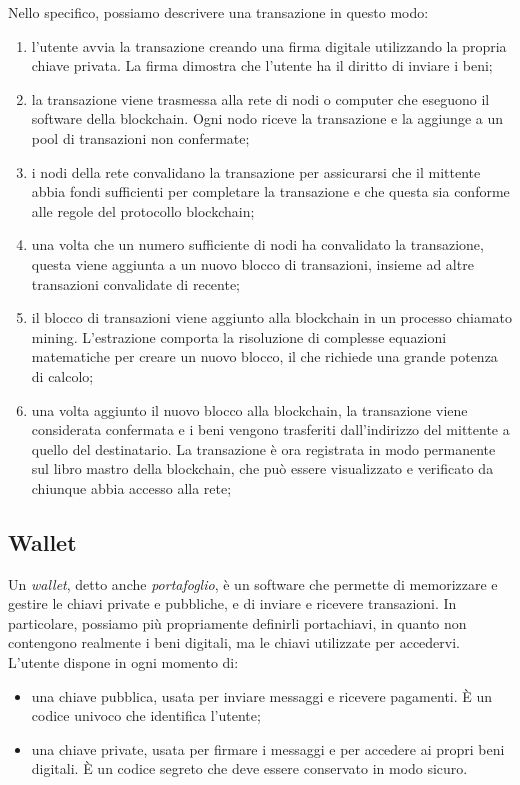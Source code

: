 Nello specifico, possiamo descrivere una transazione in questo modo:
\begin{enumerate}
    \item l'utente avvia la transazione creando una firma digitale utilizzando la propria chiave privata. La firma dimostra che l'utente ha il diritto di inviare i beni;
    \item la transazione viene trasmessa alla rete di nodi o computer che eseguono il software della blockchain. Ogni nodo riceve la transazione e la aggiunge a un pool di transazioni non confermate;
    \item i nodi della rete convalidano la transazione per assicurarsi che il mittente abbia fondi sufficienti per completare la transazione e che questa sia conforme alle regole del protocollo blockchain;
    \item una volta che un numero sufficiente di nodi ha convalidato la transazione, questa viene aggiunta a un nuovo blocco di transazioni, insieme ad altre transazioni convalidate di recente;
    \item il blocco di transazioni viene aggiunto alla blockchain in un processo chiamato mining. L'estrazione comporta la risoluzione di complesse equazioni matematiche per creare un nuovo blocco, il che richiede una grande potenza di calcolo;
    \item una volta aggiunto il nuovo blocco alla blockchain, la transazione viene considerata confermata e i beni vengono trasferiti dall'indirizzo del mittente a quello del destinatario. La transazione è ora registrata in modo permanente sul libro mastro della blockchain, che può essere visualizzato e verificato da chiunque abbia accesso alla rete;
\end{enumerate}

\subsection{Wallet}\label{sec:tecnologie-blockchain-wallet}

Un \textit{wallet}, detto anche \textit{portafoglio}, è un software che permette di memorizzare e gestire le chiavi private e pubbliche, e di inviare e ricevere transazioni.
In particolare, possiamo più propriamente definirli portachiavi, in quanto non contengono realmente i beni digitali, ma le chiavi utilizzate per accedervi.
L'utente dispone in ogni momento di:
\begin{itemize}
    \item una chiave pubblica, usata per inviare messaggi e ricevere pagamenti. È un codice univoco che identifica l'utente;
    \item una chiave private, usata per firmare i messaggi e per accedere ai propri beni digitali. È un codice segreto che deve essere conservato in modo sicuro.
\end{itemize} 

